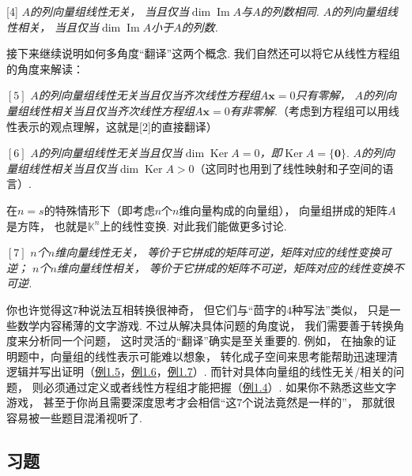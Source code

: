 [4]
\textit{$A$的列向量组线性无关，
当且仅当}$\dim\operatorname{Im}A$\textit{与$A$的列数相同.}
\textit{$A$的列向量组线性相关，
当且仅当}$\dim\operatorname{Im}A$\textit{小于$A$的列数.}
\medskip

接下来继续说明如何多角度“翻译”这两个概念.
我们自然还可以将它从线性方程组的角度来解读：\medskip

$[5]$\textit{
$A$的列向量组线性无关当且仅当齐次线性方程组$A\bm{x} = 0$只有零解，
$A$的列向量组线性相关当且仅当齐次线性方程组$A\bm{x} = 0$有非零解.}（考虑到方程组可以用线性表示的观点理解，这就是[2]的直接翻译）\medskip


$[6]$
\textit{$A$的列向量组线性无关当且仅当}$\dim \operatorname{Ker}A = 0$\textit{，即}$\operatorname{Ker}A = \{\bm{0}\}$.
\textit{$A$的列向量组线性相关当且仅当}$\dim \operatorname{Ker}A > 0$（这同时也用到了线性映射和子空间的语言）.\medskip


在$n = s$的特殊情形下（即考虑$n$个$n$维向量构成的向量组），
向量组拼成的矩阵$A$是方阵，
也就是$\mathbb{K}^n$上的线性变换.
对此我们能做更多讨论.\medskip

$[7]$
\textit{$n$个$n$维向量线性无关，
等价于它拼成的矩阵可逆，矩阵对应的线性变换可逆；
$n$个$n$维向量线性相关，
等价于它拼成的矩阵不可逆，矩阵对应的线性变换不可逆.}\medskip

你也许觉得这$7$种说法互相转换很神奇，
但它们与“茴字的$4$种写法”类似，
只是一些数学内容稀薄的文字游戏.
不过从解决具体问题的角度说，
我们需要善于转换角度来分析同一个问题，
这时灵活的“翻译”确实是至关重要的.
例如，
在抽象的证明题中，向量组的线性表示可能难以想象，
转化成子空间来思考能帮助迅速理清逻辑并写出证明（\hyperlink{T1.5}{例1.5}，\hyperlink{T1.6}{例1.6}，\hyperlink{T1.7}{例1.7}）.
而针对具体向量组的线性无关/相关的问题，
则必须通过定义或者线性方程组才能把握（\hyperlink{T1.4}{例1.4}）.
如果你不熟悉这些文字游戏，
甚至于你尚且需要深度思考才会相信“这$7$个说法竟然是一样的”，
那就很容易被一些题目混淆视听了.\medskip

\subsection{习题}

